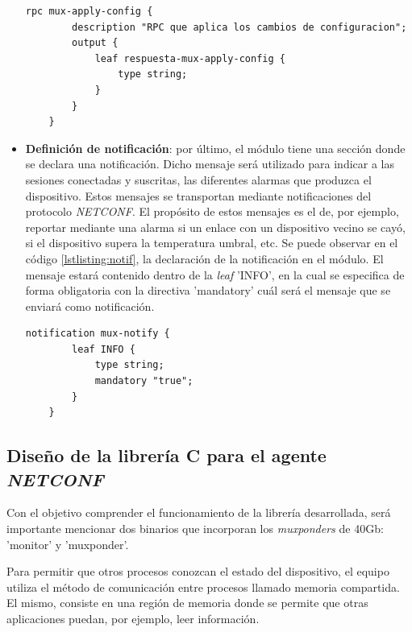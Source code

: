 \begin{itemize}
    

    \begin{lstlisting}[language=SHELXL, caption=Declaración de \textit{RPC}., label=lstlisting:RPC]
    rpc mux-apply-config {        
        description "RPC que aplica los cambios de configuracion";
        output {
            leaf respuesta-mux-apply-config {
                type string;
            }
        }
    }
    \end{lstlisting}

    \item \textbf{Definición de notificación}: por último, el módulo tiene una sección donde se declara una notificación. Dicho mensaje será utilizado para indicar a las sesiones conectadas y suscritas, las diferentes alarmas que produzca el dispositivo. Estos mensajes se transportan mediante notificaciones del protocolo \textit{NETCONF}. El propósito de estos mensajes es el de, por ejemplo, reportar mediante una alarma si un enlace con un dispositivo vecino se cayó, si el dispositivo supera la temperatura umbral, etc. Se puede observar en el código \ref{lstlisting:notif}, la declaración de la notificación en el módulo. El mensaje estará contenido dentro de la \textit{leaf} ’INFO’, en la cual se especifica de forma obligatoria con la directiva ’mandatory’ cuál será el mensaje que se enviará como notificación.

    \begin{lstlisting}[language=SHELXL, caption=Declaración de notificación., label=lstlisting:notif]
    notification mux-notify {
        leaf INFO {
            type string;
            mandatory "true";
        }
    }
    \end{lstlisting}

\end{itemize}

\subsection{Diseño de la librería C para el agente \textit{NETCONF}}
Con el objetivo comprender el funcionamiento de la librería desarrollada, será importante mencionar dos binarios que incorporan los \textit{muxponders} de 40Gb: 'monitor' y 'muxponder'. 

Para permitir que otros procesos conozcan el estado del dispositivo, el equipo utiliza el método de comunicación entre procesos llamado memoria compartida. El mismo, consiste en una región de memoria donde se permite que otras aplicaciones puedan, por ejemplo, leer información. 

